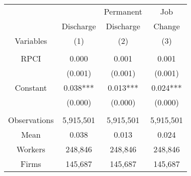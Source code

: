 \begin{tabular}{c|ccc}
\toprule
\toprule
      &       & \multicolumn{1}{p{6.25em}}{Permanent} & \multicolumn{1}{p{6.25em}}{Job} \\
      & \multicolumn{1}{p{6.25em}}{Discharge} & \multicolumn{1}{p{6.25em}}{Discharge} & \multicolumn{1}{p{6.25em}}{Change} \\
Variables & \multicolumn{1}{p{6.25em}}{(1)} & \multicolumn{1}{p{6.25em}}{(2)} & \multicolumn{1}{p{6.25em}}{(3)} \\
\midrule
      &       &       &  \\
RPCI  & 0.000 & 0.001 & 0.001 \\
      & (0.001) & (0.001) & (0.001) \\
Constant & \multicolumn{1}{p{6.25em}}{0.038***} & \multicolumn{1}{p{6.25em}}{0.013***} & \multicolumn{1}{p{6.25em}}{0.024***} \\
      & (0.000) & (0.000) & (0.000) \\
      &       &       &  \\
\midrule
Observations & 5,915,501 & 5,915,501 & 5,915,501 \\
Mean  & 0.038 & 0.013 & 0.024 \\
Workers & 248,846 & 248,846 & 248,846 \\
Firms & 145,687 & 145,687 & 145,687 \\
\bottomrule
\bottomrule
\end{tabular}%
